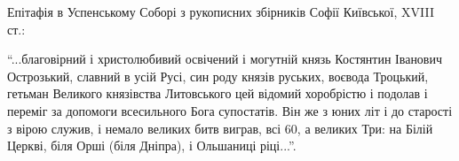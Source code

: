 Епітафія в Успенському Соборі з рукописних збірників Софії Київської, XVIII
ст.:

\enquote{...благовірний і христолюбивий освічений і могутній князь Костянтин Іванович
Острозький, славний в усій Русі, син роду князів руських, воєвода Троцький,
гетьман Великого князівства Литовського цей відомий хоробрістю і подолав і
переміг за допомоги всесильного Бога супостатів. Він же з юних літ і до
старості з вірою служив, і немало великих битв виграв, всі 60, а великих Три:
на Білій Церкві, біля Орші (біля Дніпра), і Ольшаниці ріці...}.
